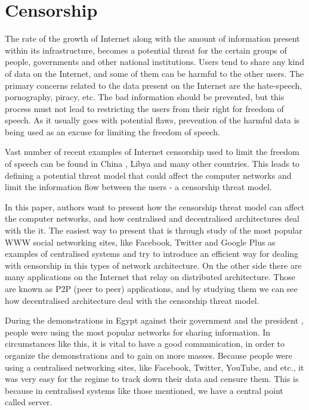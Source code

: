 \section{Censorship}
The rate of the growth of Internet along with the amount of information present within its infrastructure, becomes a potential threat for the certain groups of people, governments and other national institutions.
Users tend to share any kind of data on the Internet, and some of them can be harmful to the other users.
The primary concerns related to the data present on the Internet are the hate-speech, pornography, piracy, etc.
The bad information should be prevented, but this process must not lead to restricting the users from their right for freedom of speech.
As it usually goes with potential flaws, prevention of the harmful data is being used as an excuse for limiting the freedom of speech. 

Vast number of recent examples of Internet censorship used to limit the freedom of speech can be found in China \cite{canaves}, Libya \cite{dianotti2011} and many other countries. 
This leads to defining a potential threat model that could affect the computer networks and limit the information flow between the users - a censorship threat model.

In this paper, authors want to present how the censorship threat model can affect the computer networks, and how centralised and decentralised architectures deal with the it.
The easiest way to present that is through study of the most popular WWW social networking sites, like Facebook, Twitter and Google Plus as examples of centralised systems and try to introduce an efficient way for dealing with censorship in this types of network architecture.
On the other side there are many applications on the Internet that relay on distributed architecture.
Those are known as P2P (peer to peer) applications, and by studying them we can see how decentralised architecture deal with the censorship threat model.

During the demonstrations in Egypt against their government and the president \cite{web:scialnetworkcriticalmass}, people were using the most popular networks for sharing information.
In circumstances like this, it is vital to have a good communication, in order to organize the demonstrations and to gain on more masses. 
Because people were using a centralised networking sites, like Facebook, Twitter, YouTube, and etc., it was very easy for the regime to track down their data and censure them.
This is because in centralised systems like those mentioned, we have a central point called server. 


